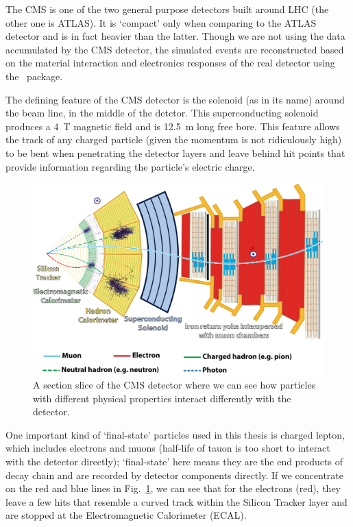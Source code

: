 The CMS is one of the two general purpose detectors built around LHC (the other one is ATLAS). It
is `compact' only when comparing to the ATLAS detector and is in fact heavier than the latter.
Though we are not using the data accumulated by the CMS detector, the simulated events are
reconstructed based on the material interaction and electronics responses of the real detector using the
\gf~package.\cite{geant4}

The defining feature of the CMS detector is the solenoid (as in its name) around the beam line, in the
middle of the detctor.
This superconducting solenoid produces a \SI{4}{\tesla} magnetic field and is 
\SI{12.5}{\meter} long free bore.\cite{validation_cms} This feature allows the track of
any charged particle (given the momentum is not ridiculously high) to be bent when penetrating
the detector layers and leave behind hit points that provide information regarding the particle's 
electric charge.


\begin{figure}[htb]
\begin{center}
\includegraphics[width=.75\linewidth]{fig/CMS_Slice.png}
\end{center}
\caption{A section slice of the CMS detector where we can see how 
particles with different physical properties interact differently with the detector.}
\label{fig:CMS_Slice}
\end{figure}

One important kind of `final-state' particles used in this thesis is charged lepton, 
which includes electrons and muons (half-life of tauon is too short to interact with
the detector directly);
`final-state' here means they are the end products of decay chain and are recorded by detector
components directly. If we concentrate on the red and blue lines in Fig.~\ref{fig:CMS_Slice}, we
can see that for the electrons (red), they leave a few hits that resemble a curved
track within the Silicon Tracker layer and are stopped at the Electromagnetic Calorimeter
(ECAL). 


